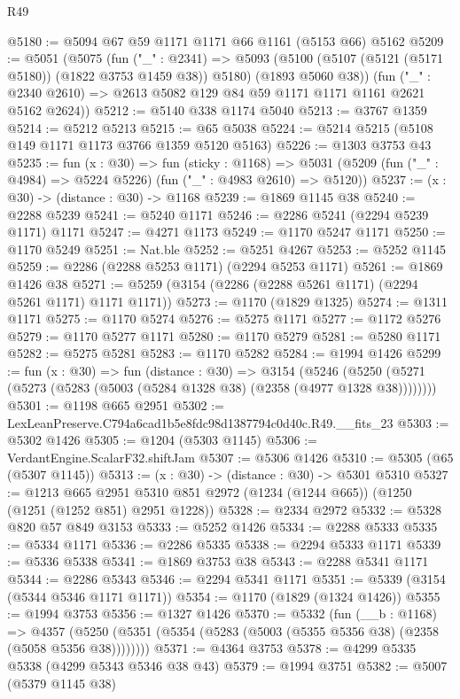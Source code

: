\begin{lexlean}{R49}
\begin{coremodule}
@5180 := @5094 @67 @59 @1171 @1171 @66 @1161 (@5153 @66) @5162
@5209 := @5051
    (@5075
      (fun ("_" : @2341) =>
      @5093 (@5100 (@5107 (@5121 (@5171 @5180)) (@1822 @3753 @1459 @38)) @5180) (@1893 @5060 @38))
      (fun ("_" : @2340 @2610) => @2613 @5082 @129 @84 @59 @1171 @1171 @1161 @2621 @5162 @2624))
@5212 := @5140 @338 @1174 @5040
@5213 := @3767 @1359
@5214 := @5212 @5213
@5215 := @65 @5038
@5224 := @5214 @5215 (@5108 @149 @1171 @1173 @3766 @1359 @5120 @5163)
@5226 := @1303 @3753 @43
@5235 := fun (x : @30) =>
  fun (sticky : @1168) =>
  @5031 (@5209 (fun ("_" : @4984) => @5224 @5226) (fun ("_" : @4983 @2610) => @5120))
@5237 := (x : @30) -> (distance : @30) -> @1168
@5239 := @1869 @1145 @38
@5240 := @2288 @5239
@5241 := @5240 @1171
@5246 := @2286 @5241 (@2294 @5239 @1171) @1171
@5247 := @4271 @1173
@5249 := @1170 @5247 @1171
@5250 := @1170 @5249
@5251 := Nat.ble
@5252 := @5251 @4267
@5253 := @5252 @1145
@5259 := @2286 (@2288 @5253 @1171) (@2294 @5253 @1171)
@5261 := @1869 @1426 @38
@5271 := @5259 (@3154 (@2286 (@2288 @5261 @1171) (@2294 @5261 @1171) @1171 @1171))
@5273 := @1170 (@1829 @1325)
@5274 := @1311 @1171
@5275 := @1170 @5274
@5276 := @5275 @1171
@5277 := @1172 @5276
@5279 := @1170 @5277 @1171
@5280 := @1170 @5279
@5281 := @5280 @1171
@5282 := @5275 @5281
@5283 := @1170 @5282
@5284 := @1994 @1426
@5299 := fun (x : @30) =>
  fun (distance : @30) =>
  @3154 (@5246 (@5250 (@5271 (@5273 (@5283 (@5003 (@5284 @1328 @38) (@2358 (@4977 @1328 @38))))))))
@5301 := @1198 @665 @2951
@5302 := LexLeanPreserve.C794a6cad1b5e8fdc98d1387794c0d40c.R49.__fits_23
@5303 := @5302 @1426
@5305 := @1204 (@5303 @1145)
@5306 := VerdantEngine.ScalarF32.shiftJam
@5307 := @5306 @1426
@5310 := @5305 (@65 (@5307 @1145))
@5313 := (x : @30) -> (distance : @30) -> @5301 @5310
@5327 := @1213
    @665
    @2951
    @5310
    @851
    @2972
    (@1234 (@1244 @665))
    (@1250 (@1251 (@1252 @851) @2951 @1228))
@5328 := @2334 @2972
@5332 := @5328 @820 @57 @849 @3153
@5333 := @5252 @1426
@5334 := @2288 @5333
@5335 := @5334 @1171
@5336 := @2286 @5335
@5338 := @2294 @5333 @1171
@5339 := @5336 @5338
@5341 := @1869 @3753 @38
@5343 := @2288 @5341 @1171
@5344 := @2286 @5343
@5346 := @2294 @5341 @1171
@5351 := @5339 (@3154 (@5344 @5346 @1171 @1171))
@5354 := @1170 (@1829 (@1324 @1426))
@5355 := @1994 @3753
@5356 := @1327 @1426
@5370 := @5332
    (fun (__b : @1168) =>
    @4357 (@5250 (@5351 (@5354 (@5283 (@5003 (@5355 @5356 @38) (@2358 (@5058 @5356 @38))))))))
@5371 := @4364 @3753
@5378 := @4299 @5335 @5338 (@4299 @5343 @5346 @38 @43)
@5379 := @1994 @3751
@5382 := @5007 (@5379 @1145 @38)

\end{coremodule}
\end{lexlean}
